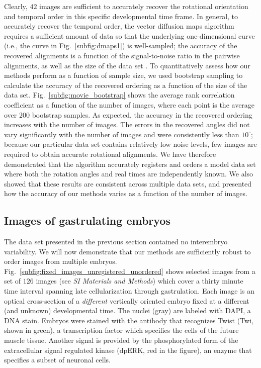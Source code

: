 \documentclass{pnastwo}
\newcommand{\SI}[0]{{\it SI Materials and Methods}}
\newcommand{\fig}[0]{Fig.}
\begin{document}
\begin{article}
Clearly, $42$ images are sufficient to accurately recover the rotational orientation and temporal order  in this specific developmental time frame.
%
In general, to accurately recover the temporal order, the vector diffusion maps algorithm requires a sufficient amount of data so that the underlying one-dimensional curve (i.e., the curve in \fig~\ref{subfig:dmaps1}) is well-sampled;
the accuracy of the recovered alignments is a function of the signal-to-noise ratio in the pairwise alignments, as well as the size of the data set \cite{singer2011angular}.
%
To quantitatively assess how our methods perform as a function of sample size, we used bootstrap sampling to calculate the accuracy of the recovered ordering as a function of the size of the data set.
%
\fig~\ref{subfig:movie_bootstrap} shows the average rank correlation coefficient as a function of the number of images, where each point is the average over $200$ bootstrap samples.
%
As expected, the accuracy in the recovered ordering increases with the number of images. 
%
The errors in the recovered angles did not vary significantly with the number of images and were consistently less than $10^{\circ}$;
because our particular data set contains relatively low noise levels, few images are required to obtain accurate rotational alignments. 
%
We have therefore demonstrated that the algorithm accurately registers and orders a model data set where both the rotation angles and real times are independently known. 
%
We also showed that these results are consistent across multiple data sets, and presented how the accuracy of our methods varies as a function of the number of images.

\subsection{Images of gastrulating embryos}


The data set presented in the previous section contained no interembryo variability. 
%
We will now demonstrate that our methods are sufficiently robust to order images from multiple embryos. 
%
\fig~\ref{subfig:fixed_images_unregistered_unordered} shows selected images from a set of $126$ images (see \SI) which cover a thirty minute time interval spanning late cellularization through gastrulation.
%
Each image is an optical cross-section of a {\em different} vertically oriented embryo fixed at a different (and unknown) developmental time.
%
The nuclei (gray) are labeled with DAPI, a DNA stain.
%
Embryos were stained with the antibody that recognizes Twist (Twi, shown in green), a transcription factor which specifies the cells of the future muscle tissue.
%
Another signal is provided by the phosphorylated form of the extracellular signal regulated kinase (dpERK, red in the figure), an enzyme that specifies a subset of neuronal cells.



\end{article}
\end{document}
